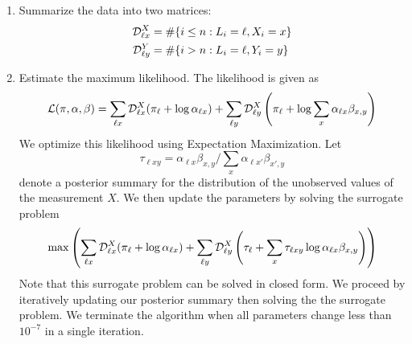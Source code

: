 \documentclass{article}
\theoremstyle{definition}
\begin{document}
\begin{enumerate}
    \item Summarize the data into two matrices:
    \begin{align*}
    \mathcal{D}^X_{\ell x} &= \#\{i\leq n: L_i=\ell,X_i=x\}\\
    \mathcal{D}^Y_{\ell y} &= \#\{i> n: L_i=\ell,Y_i=y\}
    \end{align*}

    \item Estimate the maximum likelihood.  The likelihood is given as
    \begin{align*}
    \mathcal{L}(\pi,\alpha,\beta) = \sum_{\ell x} \mathcal{D}^X_{\ell x} (\pi_\ell + \log \alpha_{\ell x}) + \sum_{\ell y} \mathcal{D}^X_{\ell y} \left( \pi_\ell + \log \sum_x \alpha_{\ell x} \beta_{x,y}\right)
    \end{align*}
    We optimize this likelihood using Expectation Maximization.  Let
    \[
    \tau_{\ell x y} = \alpha_{\ell x}\beta_{x,y} / \sum_x \alpha_{\ell x'}\beta_{x',y}
    \]
    denote a posterior summary for the distribution of the unobserved values of the measurement $X$.  We then update the parameters by solving the surrogate problem
    \begin{align*}
    \max \left(\sum_{\ell x} \mathcal{D}^X_{\ell x} (\pi_\ell + \log \alpha_{\ell x}) + \sum_{\ell y} \mathcal{D}^X_{\ell y} \left( \tau_\ell + \sum_x \tau_{\ell x y}\log\alpha_{\ell x} \beta_{x,y}\right)\right)
    \end{align*}
    Note that this surrogate problem can be solved in closed form.  We proceed by iteratively updating our posterior summary then solving the the surrogate problem.  We terminate the algorithm when all parameters change less than $10^{-7}$ in a single iteration.


\end{enumerate}
\end{document}
